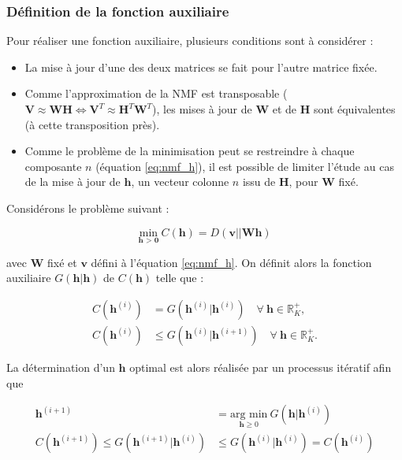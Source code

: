 \subsubsection{Définition de la fonction auxiliaire}\label{part:sub_fonction_aux}
Pour réaliser une fonction auxiliaire, plusieurs conditions sont à considérer :

\begin{itemize}
\item La mise à jour d'une des deux matrices se fait pour l'autre matrice fixée.
\item Comme l'approximation de la NMF est transposable ($\mathbf{V} \approx \mathbf{WH} \Leftrightarrow \mathbf{V}^T \approx \mathbf{H}^T \mathbf{W}^T$), les mises à jour de $\mathbf{W}$ et de $\mathbf{H}$ sont équivalentes (à cette transposition près).
\item Comme le problème de la minimisation peut se restreindre à chaque composante $n$ (équation \ref{eq:nmf_h}), il est possible de limiter l'étude au cas de la mise à jour de $\mathbf{h}$, un vecteur colonne $n$ issu de $ \mathbf{H}$, pour $\mathbf{W}$ fixé.
\end{itemize}

Considérons le problème suivant :

\begin{equation}\label{eq:costFunctionMM}
\underset{\textbf{h > 0}}{\text{min}}~C(\mathbf{h}) = D(\mathbf{v} \vert\vert \mathbf{Wh})
\end{equation}

avec $\mathbf{W}$ fixé et $\mathbf{v}$ défini à l'équation \ref{eq:nmf_h}. On définit alors la fonction auxiliaire $G(\mathbf{h}\vert \mathbf{h})$ de $C(\mathbf{h})$ telle que :

\begin{subequations}\label{eqs:conditionAux}
\begin{align}
C(\mathbf{h}^{\left(i\right)}) &= G(\mathbf{h}^{(i)}\vert \mathbf{h}^{(i)}) \quad \forall~\mathbf{h} \in \mathbb{R}^+_K,\\
C(\mathbf{h}^{(i)}) &\leq G(\mathbf{h}^{(i)} \vert \mathbf{h}^{(i+1)}) \quad \forall~\mathbf{h} \in \mathbb{R}^+_K.
\end{align}
\end{subequations}

La détermination d'un $\mathbf{h}$ optimal est alors réalisée par un processus itératif afin que

\begin{subequations}\label{eqs:conditionAux2}
\begin{align}
\textbf{h}^{(i+1)} &= \underset{\textbf{h} \geq 0}{\text{arg min}}~ G(\textbf{h}\vert \textbf{h}^{(i)})\\
C(\mathbf{h}^{(i+1)}) \leq G(\textbf{h}^{(i+1)}\vert\mathbf{h}^{(i)}) &\leq G(\textbf{h}^{(i)}\vert\mathbf{h}^{(i)}) = C(\mathbf{h}^{(i)})\label{eq:monotonie}
\end{align}
\end{subequations}

